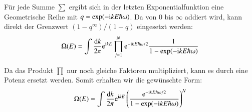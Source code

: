Für jede Summe $\sum$ ergibt sich in der letzten Exponentialfunktion eine Geometrische Reihe mit $q = \exp( - \mathrm i k E \hbar\omega)$. Da von 0 bis $\infty$ addiert wird, kann direkt der Grenzwert $(1 - q^\infty)/(1-q)$ eingesetzt werden:
\[
    \Omega(E) =
    \int \frac{\dif k}{2 \pi}
    \eup^{\iup k E}
    \prod_{j=1}^N
    \eup^{-\iup k E \hbar\omega /2}
    \frac1{1 - \exp( - \iup k E \hbar\omega)}
\]

Da das Produkt $\prod$ nur noch gleiche Faktoren multipliziert, kann es durch
eine Potenz ersetzt werden. Somit erhalten wir die gewünschte Form:
\[
    \Omega(E) =
    \int \frac{\dif k}{2 \pi}
    \eup^{\iup k E}
    \del{ \frac{\eup^{-\iup k E \hbar\omega /2}}{1 - \exp( - \iup k E \hbar\omega)} }^N
\]

\subsection{}

\printbibliography



